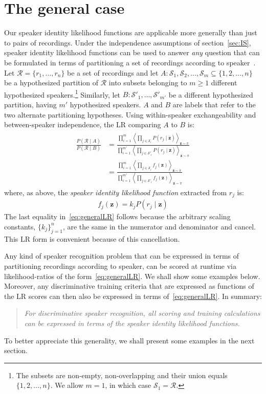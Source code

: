 \documentclass[a4paper,oneside,12pt,english]{report}
\def\zvec{\mathbf{z}}
\def\expvb#1#2{\left\langle#1\right\rangle_{#2}}
\def\Rset{\mathcal{R}}
\def\Sset{\mathcal{S}}
\begin{document}
\section{The general case}
\label{sec:general}
Our speaker identity likelihood functions are applicable more generally than just to pairs of recordings. Under the independence assumptions of section~\ref{sec:IS}, speaker identity likelihood functions can be used to answer \emph{any} question that can be formulated in terms of partitioning a set of recordings according to speaker~\cite{SPP}. Let $\Rset=\{r_1,\ldots,r_n\}$ be a set of recordings and let $A: \Sset_1,\Sset_2,\ldots,\Sset_m\subseteq\{1,2,\ldots,n\}$ be a hypothesized partition of $\Rset$ into subsets belonging to $m\ge1$ different hypothesized speakers.\footnote{The subsets are non-empty, non-overlapping and their union equals $\{1,2,\ldots,n\}$. We allow $m=1$, in which case $\Sset_1=\Rset$.} Similarly, let $B: \Sset'_1,\ldots,\Sset'_{m'}$ be a different hypothesized partition, having $m'$ hypothesized speakers. $A$ and $B$ are labels that refer to the two alternate partitioning hypotheses. Using within-speaker exchangeability and between-speaker independence, the LR comparing $A$ to $B$ is:
\begin{align}
\label{eq:generalLR}
\begin{split}
\frac{P(\Rset\mid A)}{P(\Rset\mid B)} &=
\frac{\prod_{i=1}^m \expvb{\prod_{j\in\Sset_i} P(r_j\mid\zvec)}{\zvec\sim\pi}}
{\prod_{i=1}^{m'} \expvb{\prod_{j\in\Sset'_i} P(r_j\mid\zvec)}{\zvec\sim\pi}} \\
&= \frac{\prod_{i=1}^m \expvb{\prod_{j\in\Sset_i} f_j(\zvec)}{\zvec\sim\pi}}
{\prod_{i=1}^{m'} \expvb{\prod_{j\in\Sset'_i} f_j(\zvec)}{\zvec\sim\pi}} 
\end{split}
\end{align}
where, as above, the \emph{speaker identity likelihood function} extracted from $r_j$ is:
\begin{align}
f_j(\zvec)=k_jP(r_j\mid\zvec)
\end{align}
The last equality in~\eqref{eq:generalLR} follows because the arbitrary scaling constants, $\{k_j\}_{j=1}^n$, are the same in the numerator and denominator and cancel. This LR form is convenient because of this cancellation.

Any kind of speaker recognition problem that can be expressed in terms of partitioning recordings according to speaker, can be scored at runtime via likelihood-ratios of the form~\eqref{eq:generalLR}. We shall show some examples below.  Moreover, any discriminative training criteria that are expressed as functions of the LR scores can then also be expressed in terms of~\eqref{eq:generalLR}. In summary: 
\begin{quote}
\emph{For discriminative speaker recognition, all scoring and training calculations can be expressed in terms of the speaker identity likelihood functions.} 
\end{quote}
To better appreciate this generality, we shall present some examples in the next section.
\end{document}
